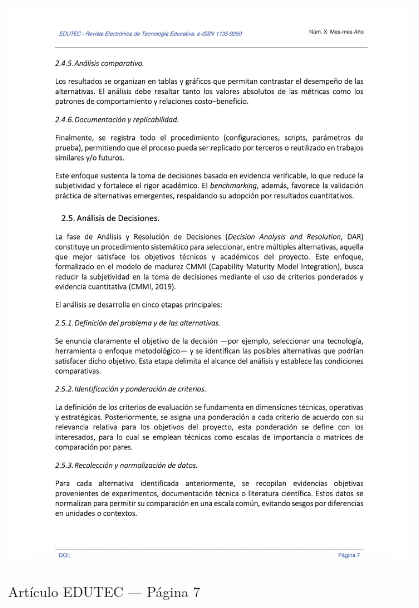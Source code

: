 \begin{figure}[H]
    \centering
    \begin{tcolorbox}[
        colback=white,
        colframe=gray!50,
        boxrule=1pt,
        arc=2pt,
        boxsep=5pt,
        left=3pt,
        right=3pt,
        top=3pt,
        bottom=3pt,
        drop shadow
    ]
        \includegraphics[width=0.95\textwidth,keepaspectratio]{apendices/EDUTEC/7.png}
    \end{tcolorbox}
    \caption{Artículo EDUTEC --- Página 7}\label{fig:edutec-pagina-7}
\end{figure}
\FloatBarrier

